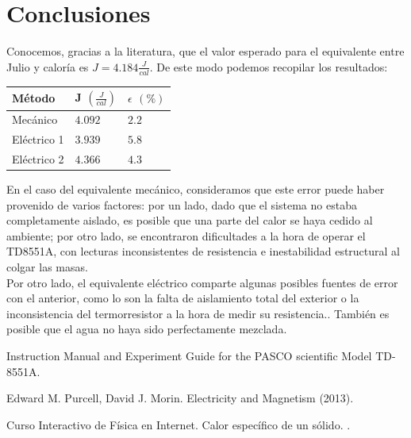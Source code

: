\documentclass{article}
\begin{document}
\section{Conclusiones}
Conocemos, gracias a la literatura\cite{pasco}, que el valor esperado para el equivalente entre Julio y caloría es $J = 4.184 \frac{J}{cal}$. De este modo podemos recopilar los resultados:

\begin{table}[H]
\centering
\begin{tabular}{l|l|l}
Método      & J $\left ( \frac{J}{cal} \right )$ & $\epsilon$ $(\%)$ \\
\hline
Mecánico    & $4.092$ & $2.2$ \\
Eléctrico 1 & $3.939$ & $5.8$ \\
Eléctrico 2 & $4.366$ & $4.3$ \\
\end{tabular}
\end{table}

En el caso del equivalente mecánico, consideramos que este error puede haber provenido de varios factores: por un lado, dado que el sistema no estaba completamente aislado, es posible que una parte del calor se haya cedido al ambiente; por otro lado, se encontraron dificultades a la hora de operar el TD8551A, con lecturas inconsistentes de resistencia e inestabilidad estructural al colgar las masas.\\

Por otro lado, el equivalente eléctrico comparte algunas posibles fuentes de error con el anterior, como lo son la falta de aislamiento total del exterior o la inconsistencia del termorresistor a la hora de medir su resistencia.. También es posible que el agua no haya sido perfectamente mezclada.


\begin{thebibliography}{X}

 Instruction Manual and Experiment Guide for the PASCO scientific Model TD-8551A. 

 Edward M. Purcell, David J. Morin. Electricity and Magnetism (2013).

 Curso Interactivo de Física en Internet. Calor específico de un sólido. . 

\end{thebibliography}
\end{document}
